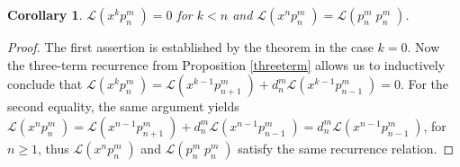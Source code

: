 \documentclass{amsart}
\newcommand{\p}[2]{p_{#1}^{#2}\;\!\!}
\renewcommand{\L}{\mathcal{L}}
\theoremstyle{plain}
\newtheorem{corollary}[theorem]{Corollary}
\theoremstyle{definition}
\theoremstyle{remark}
\begin{document}
\begin{corollary} \label{pcor}
 $\L(x^{k}\p{n}{m}) = 0$ for $k < n$ and $\L(x^n\p{n}{m})= \L(\p{n}{m}\p{n}{m})$.
\end{corollary}
\begin{proof}
The first assertion is established by the theorem in the case $k=0$. Now the three-term recurrence from Proposition \ref{threeterm} allows us to inductively conclude that $\L(x^k\p{n}{m}) = \L(x^{k-1}\p{n+1}{m})+d_n^m\L(x^{k-1}\p{n-1}{m}) =0$. For the second equality, the same argument yields $\L(x^n\p{n}{m}) = \L(x^{n-1}\p{n+1}{m})+d_n^m\L(x^{n-1}\p{n-1}{m})=d_n^m\L(x^{n-1}\p{n-1}{m})$, for $n\geq 1$, thus $\L(x^n\p{n}{m})$ and $\L(\p{n}{m}\p{n}{m})$ satisfy the same recurrence relation.
\end{proof}
\end{document}
